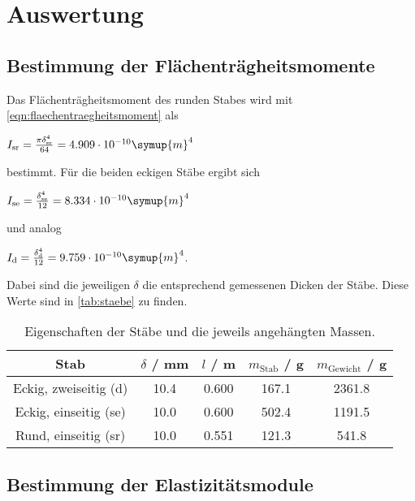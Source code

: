\section{Auswertung}
\label{sec:Auswertung}
\subsection{Bestimmung der Flächenträgheitsmomente}

Das Flächenträgheitsmoment des runden Stabes wird mit \eqref{eqn:flaechentraegheitsmoment} als

\vspace{.5em}
\centerline{$I_\text{sr} = \frac{\pi \delta_\text{sr}^4}{64} = 4.909 \cdot 10^{-10} \symup{m}^4$}
\vspace{.5em}

bestimmt. Für die beiden eckigen Stäbe ergibt sich 

\vspace{.5em}
\centerline{$I_\text{se} = \frac{\delta_\text{se}^4}{12} = 8.334 \cdot 10^{-10} \symup{m}^4$}
\vspace{.5em}

und analog

\vspace{.5em}
\centerline{$I_\text{d} = \frac{\delta_\text{d}^4}{12} = 9.759 \cdot 10^{-10} \symup{m}^4$.}
\vspace{.5em}

Dabei sind die jeweiligen $\delta$ die entsprechend gemessenen Dicken der Stäbe. Diese Werte sind in \autoref{tab:staebe} zu finden.

\begin{table}[!htp]
  \centering
  \caption{Eigenschaften der Stäbe und die jeweils angehängten Massen.}
  \label{tab:staebe}
  \begin{tabular}{c S[table-format=2.1] S[table-format=1.3] S[table-format=3.1] S[table-format=4.1]}
    \toprule
    {Stab} & {$\delta$ / mm} & {$l$ / m} & {$m_\text{Stab}$ / g} & {$m_\text{Gewicht}$ / g} \\
    \midrule
    Eckig, zweiseitig (d) & 10.4 & 0.600 & 167.1 & 2361.8 \\
    Eckig, einseitig (se) & 10.0 & 0.600 & 502.4 & 1191.5 \\
    Rund, einseitig (sr)  & 10.0 & 0.551 & 121.3 &  541.8 \\
    \bottomrule
  \end{tabular}
\end{table}

\subsection{Bestimmung der Elastizitätsmodule}


